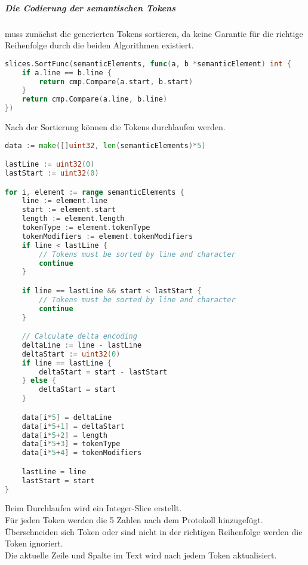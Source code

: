 \documentclass[./einleitung.tex]{subfiles}
\begin{document}
    \subparagraph{Die Codierung der semantischen Tokens} muss zunächst die generierten Tokens sortieren, da keine Garantie für die richtige Reihenfolge durch die beiden Algorithmen existiert.
    \begin{lstlisting}[language=Go,label={lst:sortSemanticTokens}]
slices.SortFunc(semanticElements, func(a, b *semanticElement) int {
    if a.line == b.line {
        return cmp.Compare(a.start, b.start)
    }
    return cmp.Compare(a.line, b.line)
})
    \end{lstlisting}
    Nach der Sortierung können die Tokens durchlaufen werden.
    \begin{lstlisting}[language=Go]
data := make([]uint32, len(semanticElements)*5)

lastLine := uint32(0)
lastStart := uint32(0)

for i, element := range semanticElements {
    line := element.line
    start := element.start
    length := element.length
    tokenType := element.tokenType
    tokenModifiers := element.tokenModifiers
    if line < lastLine {
        // Tokens must be sorted by line and character
        continue
    }

    if line == lastLine && start < lastStart {
        // Tokens must be sorted by line and character
        continue
    }

    // Calculate delta encoding
    deltaLine := line - lastLine
    deltaStart := uint32(0)
    if line == lastLine {
        deltaStart = start - lastStart
    } else {
        deltaStart = start
    }

    data[i*5] = deltaLine
    data[i*5+1] = deltaStart
    data[i*5+2] = length
    data[i*5+3] = tokenType
    data[i*5+4] = tokenModifiers

    lastLine = line
    lastStart = start
}
    \end{lstlisting}
    Beim Durchlaufen wird ein Integer-Slice erstellt. \\
    Für jeden Token werden die 5 Zahlen nach dem Protokoll hinzugefügt. \\
    Überschneiden sich Token oder sind nicht in der richtigen Reihenfolge werden die Token ignoriert. \\
    Die aktuelle Zeile und Spalte im Text wird nach jedem Token aktualisiert.
\end{document}
